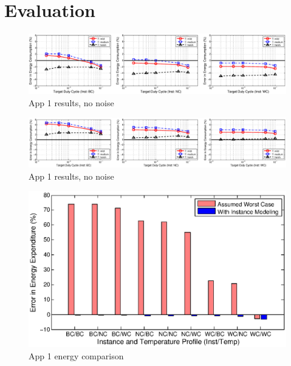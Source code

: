 \section{Evaluation}

\begin{figure}
\centering
\includegraphics[width=1\textwidth]{figures/app1_nonoise.eps}
\caption{\label{fig:app1}App 1 results, no noise}
\end{figure}

\begin{figure}
\centering
\includegraphics[width=1\textwidth]{figures/app1_guardband.eps}
\caption{\label{fig:app1}App 1 results, no noise}
\end{figure}

\begin{figure}
\centering
\includegraphics[width=1\columnwidth]{figures/app1_energycomp.eps}
\caption{\label{fig:app1}App 1 energy comparison}
\end{figure}

